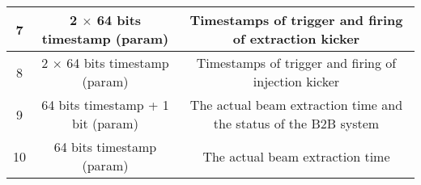 \begin{landscape}
\begin{table}[!htb]
\begin{center}
\begin{tabular}{ | c | c | c | c | c | c |}
7&	\multicolumn{3}{c|}{2 $\times$ 64 bits timestamp (param)} &\multicolumn{2}{c|}{ Timestamps of trigger and firing of extraction kicker}\\ \hline
8&	\multicolumn{3}{c|}{2 $\times$ 64 bits timestamp (param)} &	\multicolumn{2}{c|}{Timestamps of trigger and firing of injection kicker}\\ \hline

9&	\multicolumn{3}{c|}{64 bits timestamp + 1 bit (param)}&	\multicolumn{2}{c|}{The actual beam extraction time and the status of the B2B system}  \\ \hline

10& \multicolumn{3}{c|}{64 bits timestamp (param)}	&	\multicolumn{2}{c|}{The actual beam extraction time} \\ \hline

    \end{tabular}
\end{center}
\end{table}
\end{landscape} 